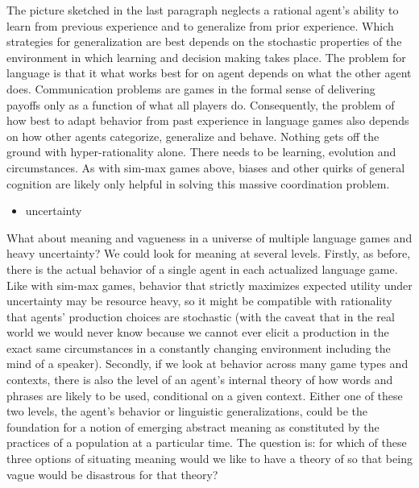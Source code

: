 \documentclass[a4paper]{article}
\begin{document}
The picture sketched in the last paragraph neglects a rational agent's ability to learn from previous experience and to generalize from prior experience. Which strategies for generalization are best depends on the stochastic properties of the environment in which learning and decision making takes place. The problem for language is that it what works best for on agent depends on what the other agent does. Communication problems are games in the formal sense of delivering payoffs only as a function of what all players do. Consequently, the problem of how best to adapt behavior from past experience in language games also depends on how other agents categorize, generalize and behave. Nothing gets off the ground with hyper-rationality alone. There needs to be learning, evolution and circumstances. As with sim-max games above, biases and other quirks of general cognition are likely only helpful in solving this massive coordination problem.

\begin{itemize}
\item uncertainty
\end{itemize}

What about meaning and vagueness in a universe of multiple language games and heavy uncertainty? We could look for meaning at several levels. Firstly, as before, there is the actual behavior of a single agent in each actualized language game. Like with sim-max games, behavior that strictly maximizes expected utility under uncertainty may be resource heavy, so it might be compatible with rationality that agents' production choices are stochastic (with the caveat that in the real world we would never know because we cannot ever elicit a production in the exact same circumstances in a constantly changing environment including the mind of a speaker). Secondly, if we look at behavior across many game types and contexts, there is also the level of an agent's internal theory of how words and phrases are likely to be used, conditional on a given context. Either one of these two levels, the agent's behavior or linguistic generalizations, could be the foundation for a notion of emerging abstract meaning as constituted by the practices of a population at a particular time. The question is: for which of these three options of situating meaning would we like to have a theory of so that being vague would be disastrous for that theory?
\end{document}

